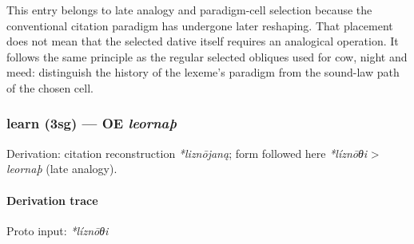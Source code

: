 \documentclass[
  british,
  a4paper,
]{article}
\begin{document}
This entry belongs to late analogy and paradigm-cell selection because
the conventional citation paradigm has undergone later reshaping. That
placement does not mean that the selected dative itself requires an
analogical operation. It follows the same principle as the regular
selected obliques used for cow, night and meed: distinguish the history
of the lexeme's paradigm from the sound-law path of the chosen cell.

\subsubsection{\texorpdfstring{learn (3sg) --- OE
\emph{leornaþ}}{learn (3sg) --- OE leornaþ}}\label{learn-3sg-oe-leornauxfe}

Derivation: citation reconstruction \emph{*liznōjaną}; form followed
here \emph{*líznōθi} \textgreater{} \emph{leornaþ} (late analogy).

\paragraph{Derivation trace}\label{derivation-trace-156}

Proto input: \emph{*líznōθi}

\begingroup
\setlength{\fboxsep}{6pt}
\end{document}
